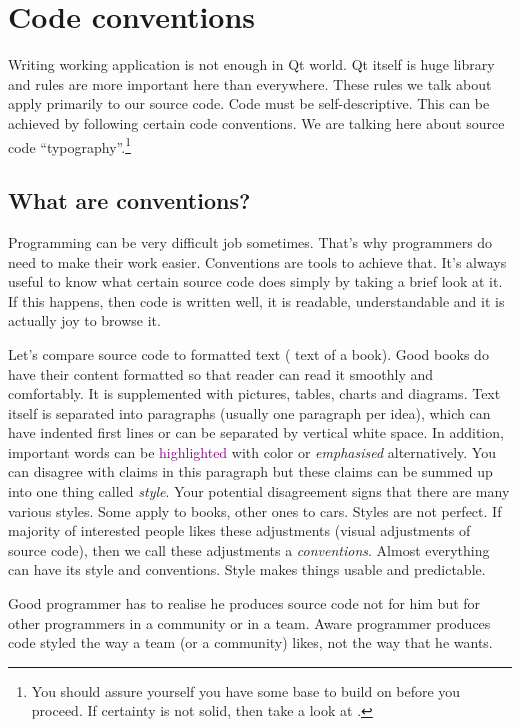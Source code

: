 \section{Code conventions}
Writing working application is not enough in Qt world. Qt itself is huge library and rules are more important here than everywhere. These rules we talk about apply primarily to our source code. Code must be self-descriptive. This can be achieved by following certain code conventions. We are talking here about source code \enquote{typography}.\footnote{You should assure yourself you have some base to build on before you proceed. If certainty is not solid, then take a look at \citep[p.~40-77]{mcconnell:codecomplete}.}

\subsection{What are conventions?}
Programming can be very difficult job sometimes. That's why programmers do need to make their work easier. Conventions are tools to achieve that. It's always useful to know what certain source code does simply by taking a brief look at it. If this happens, then code is written well, it is readable, understandable and it is actually joy to browse it.

Let's compare source code to formatted text (\eg{} text of a book). Good books do have their content formatted so that reader can read it smoothly and comfortably. It is supplemented with pictures, tables, charts and diagrams. Text itself is separated into paragraphs (usually one paragraph per idea), which can have indented first lines or can be separated by vertical white space. In addition, important words can be \textcolor{purple}{highlighted} with color or \emph{emphasised} alternatively. You can disagree with claims in this paragraph but these claims can be summed up into one thing called \emph{style}. Your potential disagreement signs that there are many various styles. Some apply to books, other ones to cars. Styles are not perfect. If majority of interested people likes these adjustments (\eg visual adjustments of source code), then we call these adjustments a \emph{conventions}. Almost everything can have its style and conventions. Style makes things usable and predictable.

Good programmer has to realise he produces source code not for him but for other programmers in a community or in a team. Aware programmer produces code styled the way a team (or a community) likes, not the way that he wants.

